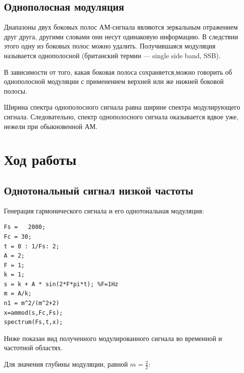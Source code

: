 \documentclass[a4paper,14pt]{article}
\begin{document}
\subsection{Однополосная модуляция}

\hspace{0,5cm} Диапазоны двух боковых полос АМ-сигнала являются зеркальным отражением друг друга, другими словами они несут одинаковую информацию. В следствии этого одну из боковых полос можно удалить. Получившаяся модуляция называется однополосной (британский термин — single side band, SSB).

\hspace{0,5cm}В зависимости от того, какая боковая полоса сохраняется,можно говорить об
однополосной модуляции с применением верхней или же нижней боковой полосы.

\hspace{0,5cm}Ширина спектра однополосного сигнала равна ширине спектра модулирующего сигнала. Следовательно, спектр однополосного сигнала оказывается вдвое уже, нежели при обыкновенной АМ.

\section{Ход работы}
\subsection{Однотональный сигнал низкой частоты}
Генерация гармонического сигнала и его однотональная модуляция:

\begin{lstlisting}
Fs =   2000; 
Fc = 30; 
t = 0 : 1/Fs: 2; 
A = 2;  
F = 1;
k = 1;
s = k + A * sin(2*F*pi*t); %F=1Hz
m = A/k;
n1 = m^2/(m^2+2)
x=ammod(s,Fc,Fs);
spectrum(Fs,t,x);
\end{lstlisting}

Ниже показан вид полученного модулированного сигнала во временной и частотной областях.

Для значения глубины модуляции, равной $ m = \frac{2}{2} $:
\end{document}
